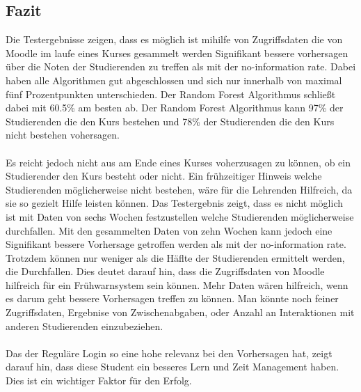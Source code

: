 \subsection{Fazit}
Die Testergebnisse zeigen, dass es möglich ist mihilfe von Zugriffsdaten die von Moodle im laufe eines Kurses gesammelt werden Signifikant bessere vorhersagen über die Noten der Studierenden zu treffen als mit der \glqq no-information rate\grqq{}.
Dabei haben alle Algorithmen gut abgeschlossen und sich nur innerhalb von maximal fünf Prozentpunkten unterschieden. Der Random Forest Algorithmus schließt dabei mit 60.5\% am besten ab.
Der Random Forest Algorithmus kann 97\% der Studierenden die den Kurs bestehen und 78\% der Studierenden die den Kurs nicht bestehen vohersagen. \cite[S. 14]{Quinn.2020}
\\ \noindent \\ \noindent
Es reicht jedoch nicht aus am Ende eines Kurses voherzusagen zu können, ob ein Studierender den Kurs besteht oder nicht.
Ein frühzeitiger Hinweis welche Studierenden möglicherweise nicht bestehen, wäre für die Lehrenden Hilfreich, da sie so gezielt Hilfe leisten können.
Das Testergebnis zeigt, dass es nicht möglich ist mit Daten von sechs Wochen festzustellen welche Studierenden möglicherweise durchfallen. 
Mit den gesammelten Daten von zehn Wochen kann jedoch eine Signifikant bessere Vorhersage getroffen werden als mit der \glqq no-information rate\grqq{}.
Trotzdem können nur weniger als die Häflte der Studierenden ermittelt werden, die Durchfallen.
Dies deutet darauf hin, dass die Zugriffsdaten von Moodle hilfreich für ein Frühwarnsystem sein können.
Mehr Daten wären hilfreich, wenn es darum geht bessere Vorhersagen treffen zu können. Man könnte noch feiner Zugriffsdaten, Ergebnise von Zwischenabgaben, oder Anzahl an Interaktionen mit anderen Studierenden einzubeziehen. \cite[S. 14ff]{Quinn.2020}
\\ \noindent \\ \noindent
Das der Reguläre Login so eine hohe relevanz bei den Vorhersagen hat, zeigt darauf hin, dass diese Student ein besseres Lern und Zeit Management haben. Dies ist ein wichtiger Faktor für den Erfolg. \cite[S. 15f]{Quinn.2020}